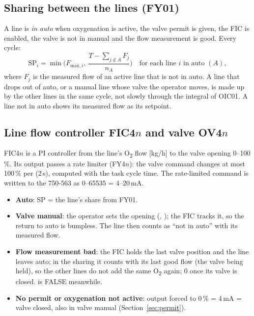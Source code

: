 \documentclass[11pt,a4paper]{article}
\newcommand{\Otwo}{O\textsubscript{2}}
\begin{document}
\subsection{Sharing between the lines (FY01)}
A line is \emph{in auto} when oxygenation is active, the valve permit is given, the FIC is
enabled, the valve is not in manual and the flow measurement is good. Every cycle:
\begin{equation*}
  \text{SP}_i = \min\!\Big(F_{\text{max},i},\ \frac{T - \sum_{j\notin A}F_j}{n_A}\Big)
  \quad \text{for each line } i \text{ in auto } (A),
\end{equation*}
where $F_j$ is the measured flow of an active line that is not in auto. A line that drops out of
auto, or a manual line whose valve the operator moves, is made up by the other lines in the
same cycle, not slowly through the integral of OIC01. A line not in auto shows its measured flow
as its setpoint.

\subsection{Line flow controller FIC4\texorpdfstring{$n$}{n} and valve OV4\texorpdfstring{$n$}{n}}
FIC4$n$ is a PI controller from the line's \Otwo{} flow [kg/h] to the valve opening 0--100\,\%.
Its output passes a rate limiter (FY4$n$): the valve command changes at most 100\,\% per
 (2\,s), computed with the task cycle time. The rate-limited command is written
to the 750-563 as 0--65535 = 4--20\,mA.
\begin{itemize}[nosep]
  \item \textbf{Auto}: SP = the line's share from FY01.
  \item \textbf{Valve manual}: the operator sets the opening (,
        ); the FIC tracks it, so the return to auto is bumpless. The line then
        counts as ``not in auto'' with its measured flow.
  \item \textbf{Flow measurement bad}: the FIC holds the last valve position and the line leaves
        auto; in the sharing it counts with its last good flow (the valve being held), so the other lines do
        not add the same \Otwo{} again; 0 once its valve is closed.  is FALSE meanwhile.
  \item \textbf{No permit or oxygenation not active}: output forced to 0\,\% = 4\,mA = valve closed,
        also in valve manual (Section~\ref{sec:permit}).
\end{itemize}
\end{document}
